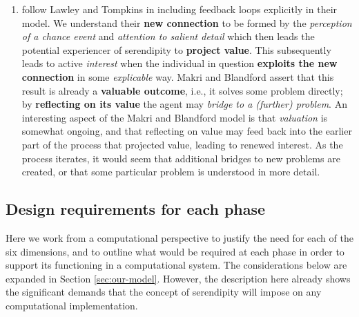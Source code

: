 \begin{enumerate}[label=(\arabic*)]
{    moment} to form a contextual \emph{explanation of the event}; and
  \textbf{amplify effects} by finding a \emph{bridge to a problem}
  that the explanation can solve.  Once all of this is done, then the
  agent may \textbf{evaluate effects}.  Note the role for a prepared
  mind in our sense---as active throughout the process---in
  supporting the ``iterative circularity'' that Lawley and Tompkins
  say may motivate several passes of recursion over the steps between
  evaluating effects and recognising potential, as well as the role of
  chance in producing opportunities to learn.
\item \citet{Makri2012a} follow Lawley and Tompkins in including
  feedback loops explicitly in their model.  We understand their
  \textbf{new connection} to be formed by the \emph{perception of a
    chance event} and \emph{attention to salient detail} which then
  leads the potential experiencer of serendipity to \textbf{project
    value}.  This subsequently leads to active \emph{interest} when
  the individual in question \textbf{exploits the new connection} in
  some \emph{explicable} way.  Makri and Blandford assert that this
  result is already a \textbf{valuable outcome}, i.e., it solves some
  problem directly; by \textbf{reflecting on its value} the agent may
  \emph{bridge to a (further) problem}.  An interesting aspect of the
  Makri and Blandford model is that \emph{valuation} is somewhat
  ongoing, and that reflecting on value may feed back into the earlier
  part of the process that projected value, leading to renewed
  interest.  As the process iterates, it would seem that additional
  bridges to new problems are created, or that some particular problem
  is understood in more detail.
\end{enumerate}



\subsection{Design requirements for each phase} \label{sec:theory-considerations}

Here we work from a computational perspective to justify the need for
each of the six dimensions, and to outline what would be required at
each phase in order to support its functioning in a computational
system.  The considerations below are expanded in Section
\ref{sec:our-model}.  However, the description here already shows the
significant demands that the concept of serendipity will impose on any
computational implementation.

